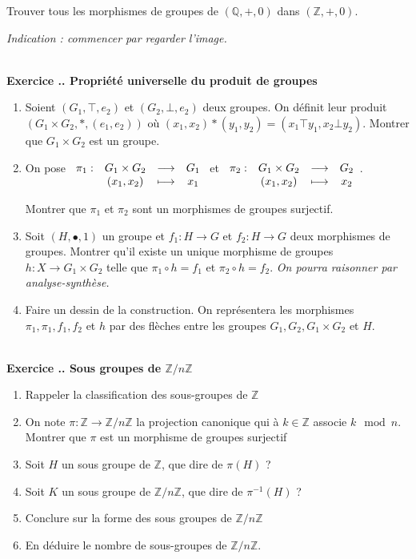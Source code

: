 \documentclass{article}
\newcommand{\fonction}[5]{\raisebox{-0.5\baselineskip}{$\begin{array}{lccc}
    #1: & #2 & \longrightarrow & #3 \\
        & #4 & \longmapsto & #5 \end{array}$}}
\newcommand{\mb}[1]{\mathbb{#1}}
\newcounter{exo}
\newcommand{\exercice}[1][\null]{\textbf{\\ Exercice \thesection.\theexo. #1} \addtocounter{exo}{1}}
\begin{document}
Trouver tous les morphismes de groupes de $(\mb{Q}, +, 0)$ dans $(\mb{Z}, +, 0)$.

\emph{Indication : commencer par regarder l'image.}

\exercice[Propriété universelle du produit de groupes]

\begin{enumerate}

\item Soient $(G_1, \top, e_2)$ et $(G_2, \bot, e_2)$ deux groupes. On définit leur produit $(G_1 \times G_2, *, (e_1,e_2))$ où $(x_1,x_2)*(y_1,y_2) = (x_1 \top y_1, x_2 \bot y_2)$. Montrer que $G_1 \times G_2$ est un groupe.

\item On pose $\fonction{\pi_1}{G_1\times G_2}{G_1}{(x_1,x_2)}{x_1}$ et $\fonction{\pi_{2}}{G_1\times G_2}{G_2}{(x_1,x_2)}{x_2}$.

Montrer que $\pi_1$ et $\pi_2$ sont un morphismes de groupes surjectif.

\item Soit $(H, \bullet, 1)$ un groupe et $f_1 : H \rightarrow G$ et $f_2 : H \rightarrow G$ deux morphismes de groupes. Montrer qu'il existe un unique morphisme de groupes $h : X \rightarrow G_1\times G_2$ telle que $\pi_1 \circ h = f_1$ et $\pi_2 \circ h = f_2$.  \emph{On pourra raisonner par analyse-synthèse.}

\item Faire un dessin de la construction. On représentera les morphismes $\pi_1, \pi_1, f_1, f_2$ et $h$ par des flèches entre les groupes $G_1, G_2, G_1 \times G_2$ et $H$.

\end{enumerate}


\exercice[Sous groupes de $\mb{Z}/n\mb{Z}$]

\begin{enumerate}
    \item Rappeler la classification des sous-groupes de $\mb{Z}$ 
    \item On note $\pi : \mb{Z} \to \mb{Z}/n\mb{Z}$ la projection 
        canonique qui à $k \in \mb{Z}$ associe $k \mod n$. Montrer 
        que $\pi$ est un morphisme de groupes surjectif
    \item Soit $H$ un sous groupe de $\mb{Z}$, que dire de $\pi(H)$ ?
    \item Soit $K$ un sous groupe de $\mb{Z}/n\mb{Z}$, que dire 
        de $\pi^{-1}(H)$ ?
    \item Conclure sur la forme des sous groupes de $\mb{Z}/n\mb{Z}$
    \item En déduire le nombre de sous-groupes de $\mb{Z}/n\mb{Z}$.
\end{enumerate}
\end{document}
